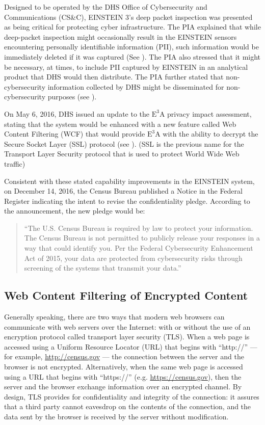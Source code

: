 \documentclass[fleqn,10pt]{wlscirep}
\newcommand{\ETA}{$\textrm{E}^\textrm{3}\textrm{A}$\xspace}
\begin{document}
Designed to be operated by the DHS Office of Cybersecurity and
Communications (CS\&C), EINSTEIN 3's deep packet inspection was
presented as being critical for protecting cyber infrastructure. The
PIA explained that while deep-packet inspection might occasionally
result in the EINSTEIN sensors encountering personally identifiable
information (PII), such information would be immediately deleted if it
was captured (See ). The PIA also stressed that it
might be necessary, at times, to include PII captured by EINSTEIN in
an analytical product that DHS would then distribute. The PIA further
stated that non-cybersecurity information collected by DHS might be
disseminated for non-cybersecurity purposes (see ).

On May 6, 2016, DHS issued an update to the \ETA privacy impact
assessment, stating that the system would be enhanced with a new
feature called Web Content Filtering (WCF) that would provide \ETA
with the ability to decrypt the Secure Socket Layer (SSL) protocol
(see ). (SSL is the
previous name for the Transport Layer Security protocol that is used
to protect World Wide Web traffic)

Consistent with these stated capability improvements in the EINSTEIN
system, on December 14, 2016, the Census Bureau published a Notice in
the Federal Register indicating the intent to revise the
confidentiality pledge.\cite{federal-register-2016-12-14} According to
the announcement, the new pledge would be:

\begin{quote}
  ``The U.S. Census Bureau is required by law to protect your
  information. The Census Bureau is not permitted to publicly release
  your responses in a way that could identify you. Per the Federal
  Cybersecurity Enhancement Act of 2015, your data are protected from
  cybersecurity risks through screening of the systems that transmit
  your data.''\cite{federal-register-2016-12-14,pledge}
\end{quote}

\subsection{Web Content Filtering of Encrypted Content}

Generally speaking, there are two ways that modern web browsers can
communicate with web servers over the Internet: with or without the
use of an encryption protocol called transport layer security
(TLS). When a web page is accessed using a Uniform Resource Locator
(URL) that begins with ``http://'' --- for example,
\url{http://census.gov} --- the connection between the server and the
browser is not encrypted. Alternatively, when the same web page is
accessed using a URL that begins with ``https://''
(e.g. \url{https://census.gov}), then the server and the browser
exchange information over an encrypted channel.  By design, TLS
provides for confidentiality and integrity of the connection: it
assures that a third party cannot eavesdrop on the contents of the
connection, and the data sent by the browser is received by the server
without modification.
\end{document}
